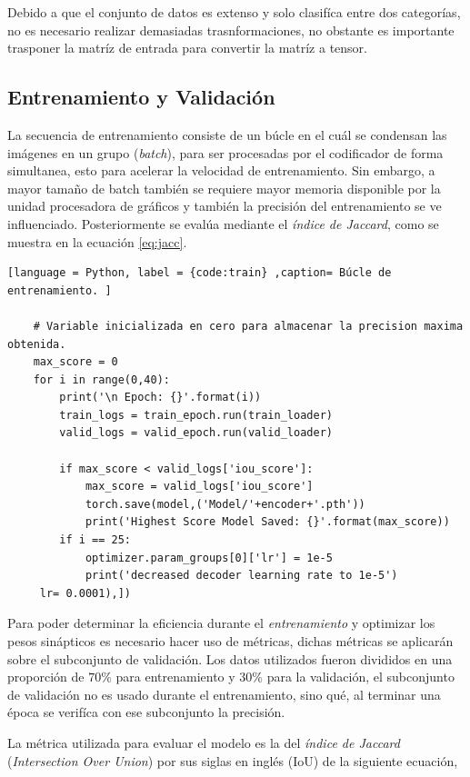 Debido a que el conjunto de datos es extenso y solo clasifíca entre dos categorías, no es necesario realizar demasiadas trasnformaciones, no obstante es importante trasponer la matríz de entrada para convertir la matríz a tensor.

\subsection{Entrenamiento y Validación}
La secuencia de entrenamiento consiste de un búcle en el cuál se condensan las imágenes en un grupo (\emph{batch}), para ser procesadas por el codificador de forma simultanea, esto para acelerar la velocidad de entrenamiento. Sin embargo, a mayor tamaño de batch también se requiere mayor memoria disponible por la unidad procesadora de gráficos y también la precisión del entrenamiento se ve influenciado. Posteriormente se evalúa mediante el \emph{índice de Jaccard}, como se muestra en la ecuación \ref{eq:jacc}.

\begin{lstlisting}[language = Python, label = {code:train} ,caption= Búcle de entrenamiento. ]

    # Variable inicializada en cero para almacenar la precision maxima obtenida.
    max_score = 0 
    for i in range(0,40):
        print('\n Epoch: {}'.format(i))
        train_logs = train_epoch.run(train_loader)
        valid_logs = valid_epoch.run(valid_loader)

        if max_score < valid_logs['iou_score']:
            max_score = valid_logs['iou_score']
            torch.save(model,('Model/'+encoder+'.pth'))
            print('Highest Score Model Saved: {}'.format(max_score))
        if i == 25:
            optimizer.param_groups[0]['lr'] = 1e-5
            print('decreased decoder learning rate to 1e-5')
     lr= 0.0001),])
\end{lstlisting}

Para poder determinar la eficiencia durante el \emph{entrenamiento} y optimizar los pesos sinápticos es necesario hacer uso de métricas, dichas métricas se aplicarán sobre el subconjunto de validación. Los datos utilizados fueron divididos en una proporción de $70\%$ para entrenamiento y $30\%$ para la validación, el subconjunto de validación no es usado durante el entrenamiento, sino qué, al terminar una época se verifíca con ese subconjunto la precisión.


La métrica utilizada para evaluar el modelo es la del \emph{índice de Jaccard} (\emph{Intersection Over Union}) por sus siglas en inglés (IoU) \citep{fpn_1} de la siguiente ecuación,

